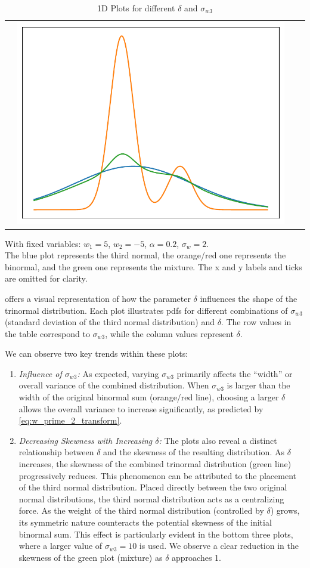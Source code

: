 \begin{table}[!htb]
\begin{tabularx}{\textwidth}{l|@{}Y@{}@{}Y@{}@{}Y@{}}
        & \includegraphics[width = .29\textwidth]{include/figures/1dplotslw100_delta9}
    \end{tabularx}
    \caption{1D Plots for different $\delta$ and $\sigma_{w3}$}
    With fixed variables: $w_1 = 5$, $w_2 = -5$, $\alpha = 0.2$, $\sigma_w = 2$. \\
    The blue plot represents the third normal,
    the orange/red one represents the binormal,
    and the green one represents the mixture.
    The x and y labels and ticks are omitted for clarity.
    \label{tab:1dplotbitri}
\end{table}
 offers a visual representation of how the parameter $\delta$ influences
the shape of the trinormal distribution.
Each plot illustrates \glspl{pdf} for different combinations of $\sigma_{w 3}$
(standard deviation of the third normal distribution) and $\delta$.
The row values in the table correspond to $\sigma_{w 3}$,
while the column values represent $\delta$.

We can observe two key trends within these plots:
\begin{enumerate}
    \item \emph{Influence of $\sigma_{w3}$:}
    As expected, varying $\sigma_{w3}$ primarily affects the \enquote{width}
    or overall variance of the combined distribution.
    When $\sigma_{w3}$ is larger than the width of the original binormal sum (orange/red line),
    choosing a larger $\delta$ allows the overall variance to increase significantly,
    as predicted by \cref{eq:w_prime_2_transform}.

    \item \emph{Decreasing Skewness with Increasing $\delta$:}
    The plots also reveal a distinct relationship between $\delta$
    and the skewness of the resulting distribution.
    As $\delta$ increases,
    the skewness of the combined trinormal distribution (green line) progressively reduces.
    This phenomenon can be attributed to the placement of the third normal distribution.
    Placed directly between the two original normal distributions,
    the third normal distribution acts as a centralizing force.
    As the weight of the third normal distribution (controlled by $\delta$) grows,
    its symmetric nature counteracts the potential skewness of the initial binormal sum.
    This effect is particularly evident in the bottom three plots,
    where a larger value of $\sigma_{w 3} = 10$ is used.
    We observe a clear reduction in the skewness of the green plot (mixture) as $\delta$ approaches 1.
\end{enumerate}
